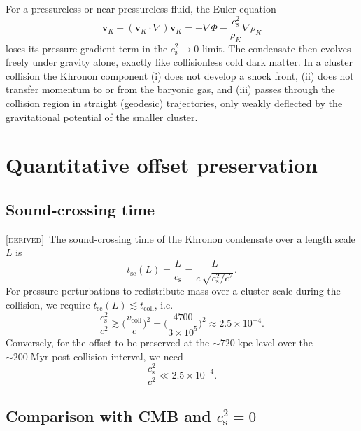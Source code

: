 \documentclass[prd,twocolumn,superscriptaddress,longbibliography,floatfix]{revtex4-2}
\newcommand{\cs}{c_{\mathrm{s}}}
\newcommand{\derived}{\textsc{[derived]}}
\begin{document}
For a pressureless or near-pressureless fluid, the
Euler equation
\begin{equation}
\dot{\mathbf{v}}_{K} + (\mathbf{v}_{K}\!\cdot\nabla)
\mathbf{v}_{K} = -\nabla\Phi - \frac{\cs^{2}}{\rho_{K}}
\nabla\rho_{K}
\label{eq:euler}
\end{equation}
loses its pressure-gradient term in the
$\cs^{2} \to 0$ limit.  The condensate then evolves
freely under gravity alone, exactly like
collisionless cold dark matter.  In a cluster
collision the Khronon component (i) does not develop
a shock front, (ii) does not transfer momentum to
or from the baryonic gas, and (iii) passes through
the collision region in straight (geodesic)
trajectories, only weakly deflected by the
gravitational potential of the smaller cluster.

\section{Quantitative offset preservation}
\label{sec:offset}

\subsection{Sound-crossing time}

\derived\ The sound-crossing time of the Khronon
condensate over a length scale $L$ is
\begin{equation}
t_{\mathrm{sc}}(L) = \frac{L}{\cs}
= \frac{L}{c\,\sqrt{\cs^{2}/c^{2}}}.
\label{eq:tsc}
\end{equation}
For pressure perturbations to redistribute mass over
a cluster scale during the collision, we require
$t_{\mathrm{sc}}(L) \lesssim t_{\mathrm{coll}}$,
i.e.\
\begin{equation}
\frac{\cs^{2}}{c^{2}} \gtrsim
\biggl(\frac{v_{\mathrm{coll}}}{c}\biggr)^{2}
= \biggl(\frac{4700}{3 \times 10^{5}}\biggr)^{2}
\approx 2.5 \times 10^{-4}.
\label{eq:cs2_crit}
\end{equation}
Conversely, for the offset to be preserved at the
$\sim 720\;\mathrm{kpc}$ level over the
$\sim 200\;\mathrm{Myr}$ post-collision interval, we
need
\begin{equation}
\frac{\cs^{2}}{c^{2}} \ll 2.5 \times 10^{-4}.
\label{eq:bullet_bound}
\end{equation}

\subsection{Comparison with CMB and $\cs^{2} = 0$}
\end{document}
